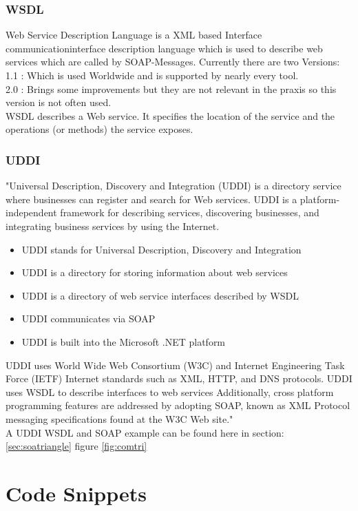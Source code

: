 \documentclass[12pt]{article}
\begin{document}
	
\subsubsection{WSDL}
Web Service Description Language is a XML based Interface communicationinterface description language
which is used to describe web services which are called by SOAP-Messages.
Currently there are two Versions:\\
1.1 : Which is used Worldwide and is supported by nearly every tool. \\
2.0 : Brings some improvements but they are not relevant in the praxis so this version is not often
used.\\
WSDL describes a Web service. It specifies the location of the service and the operations (or methods) the service exposes.\\
\cite{wsdl}\newpage
\subsubsection{UDDI}
"Universal Description, Discovery and Integration (UDDI) is a directory service where businesses can register and search for Web services.
UDDI is a platform-independent framework for describing services, discovering businesses, and integrating business services by using the Internet.\\
\begin{itemize}
\item UDDI stands for Universal Description, Discovery and Integration
\item UDDI is a directory for storing information about web services
\item UDDI is a directory of web service interfaces described by WSDL
\item UDDI communicates via SOAP
\item UDDI is built into the Microsoft .NET platform
\end{itemize}
UDDI uses World Wide Web Consortium (W3C) and Internet Engineering Task Force (IETF) Internet standards such as XML, HTTP, and DNS protocols.
UDDI uses WSDL to describe interfaces to web services Additionally, cross platform programming features are addressed by adopting SOAP, known as XML Protocol messaging specifications found at the W3C Web site."\cite{uddi}\\
A UDDI WSDL and SOAP example can be found here in section: \ref{sec:soatriangle} figure \ref{fig:comtri}
\section{Code Snippets}
\end{document}
